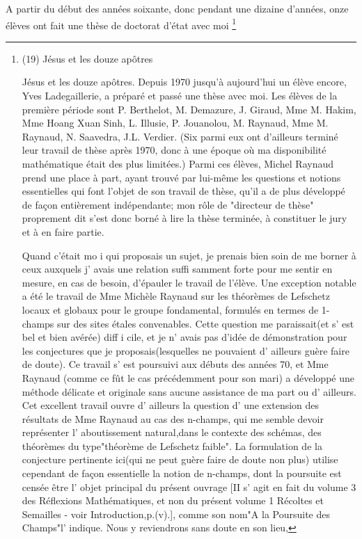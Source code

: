 A partir du début des années soixante, donc pendant une dizaine d'années, onze élèves ont fait une thèse de doctorat d'état avec moi \footnote{(19) Jésus et les douze apôtres \par Jésus et les douze apôtres. Depuis 1970 jusqu'à aujourd'hui un élève encore, Yves Ladegaillerie, a préparé et passé une thèse avec moi. Les élèves de la première période sont P. Berthelot, M. Demazure, J. Giraud, Mme M. Hakim, Mme Hoang Xuan Sinh, L. Illusie, P. Jouanolou, M. Raynaud, Mme M. Raynaud, N. Saavedra, J.L. Verdier. (Six parmi eux ont d'ailleurs terminé leur travail de thèse après 1970, donc à une époque où ma disponibilité mathématique était des plus limitées.) Parmi ces élèves, Michel Raynaud prend une place à part, ayant trouvé par lui-même les questions et notions essentielles qui font l'objet de son travail de thèse, qu'il a de plus développé de façon entièrement indépendante; mon rôle de "directeur de thèse" proprement dit s'est donc borné à lire la thèse terminée, à constituer le jury et à en faire partie.

Quand c'était mo i qui proposais un sujet, je prenais bien soin de me borner à ceux auxquels j' avais une relation suffi samment forte pour me sentir en mesure, en cas de besoin, d'épauler le travail de l'élève. Une exception notable a été le travail de Mme Michèle Raynaud sur les théorèmes de Lefschetz locaux et globaux pour le groupe fondamental, formulés en termes de 1-champs sur des sites étales convenables. Cette question me paraissait(et s' est bel et bien avérée) diff i cile, et je n' avais pas d'idée de démonstration pour les conjectures que je proposais(lesquelles ne pouvaient d' ailleurs guère faire de doute). Ce travail s' est poursuivi aux débuts des années 70, et Mme Raynaud (comme ce fût le cas précédemment pour son mari) a développé une méthode délicate et originale sans aucune assistance de ma part ou d' ailleurs. Cet excellent travail ouvre d' ailleurs la question d' une extension des résultats de Mme Raynaud au cas des n-champs, qui me semble devoir représenter l' aboutissement natural,dans le contexte des schémas, des théorèmes du type"théorème de Lefschetz faible". La formulation de la conjecture pertinente ici(qui ne peut guère faire de doute non plus) utilise cependant de façon essentielle la notion de n-champs, dont la poursuite est censée être l' objet principal du présent ouvrage [II s' agit en fait du volume 3 des Réflexions Mathématiques, et non du présent volume 1 Récoltes et Semailles - voir Introduction,p.(v).], comme son nom"A la Poursuite des Champs"l' indique. Nous y reviendrons sans doute en son lieu,

}
